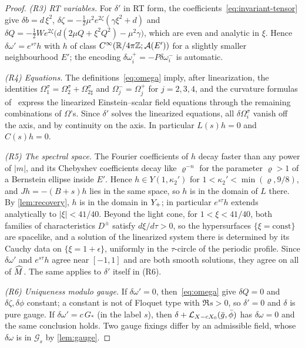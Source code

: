 \begin{proof}
\emph{(R3) RT variables.} For $\delta'$ in RT form, the coefficients~\eqref{eq:invariant-tensor} give
$\delta b=d\,\xi^2$, $\delta\zeta=-\tfrac12\mu^2e^{2\zeta}(\gamma\xi^2+d)$ and
$\delta Q=-\tfrac12We^{2\zeta}\big(d(2\mu Q+\xi^2Q^2)-\mu^2\gamma\big)$, which are even and analytic in $\xi$.
Hence $\delta\omega'=e^{s\tau}h$ with $h$ of class $C^\infty(\mathbb{R}/4\pi\mathbb{Z};\mathcal A(E'))$ for a slightly smaller
neighbourhood $E'$; the encoding $\delta\omega_i^+=-P\delta\omega_i^-$ is automatic.

\emph{(R4) Equations.} The definitions~\eqref{eq:omega} imply, after linearization, the identities
$\Omega_1^\sigma=\Omega_2^\sigma+\Omega_{2\sharp}^\sigma$ and $\Omega_j^-=\Omega_j^+$ for $j=2,3,4$, and the
curvature formulas of~\cite[\S2]{RT2019} express the linearized Einstein--scalar field equations through the
remaining combinations of $\Omega$'s. Since $\delta'$ solves the linearized equations, all $\delta\Omega_i^\sigma$
vanish off the axis, and by continuity on the axis. In particular $L(s)h=0$ and $C(s)h=0$.

\emph{(R5) The spectral space.} The Fourier coefficients of $h$ decay faster than any power of $|m|$, and
its Chebyshev coefficients decay like $\varrho^{-n}$ for the parameter $\varrho>1$ of a Bernstein ellipse
inside $E'$. Hence $h\in Y(1,\kappa_2')$ for $1<\kappa_2'<\min(\varrho,9/8)$, and $Jh=-(B+s)h$ lies in the same
space, so $h$ is in the domain of $L$ there. By \cref{lem:recovery}, $h$ is in the domain in $Y_{+}$; in particular $e^{s\tau}h$ extends analytically to
$|\xi|<41/40$. Beyond the light cone, for $1<\xi<41/40$, both families of characteristics $D^\pm$ satisfy
$d\xi/d\tau>0$, so the hypersurfaces $\{\xi=\mathrm{const}\}$ are spacelike, and a solution of the linearized
system there is determined by its Cauchy data on $\{\xi=1+\epsilon\}$, uniformly in the $\tau$-circle of the
periodic profile. Since $\delta\omega'$ and $e^{s\tau}h$ agree near $[-1,1]$ and are both smooth solutions, they
agree on all of $\widehat M$. The same applies to $\delta'$ itself in (R6).

\emph{(R6) Uniqueness modulo gauge.} If $\delta\omega'=0$, then~\eqref{eq:omega} give $\delta Q=0$ and
$\delta\zeta,\delta\phi$ constant; a constant is not of Floquet type with $\Re s>0$, so $\delta'=0$ and $\delta$
is pure gauge. If $\delta\omega'=c\,G_*$ (in the label $s$), then $\delta+\mathcal{L}_{X-cX_0}(\bar g,\bar\phi)$ has
$\delta\omega=0$ and the same conclusion holds. Two gauge fixings differ by an admissible field, whose
$\delta\omega$ is in $\mathcal G_s$ by \cref{lem:gauge}.


\end{proof}
